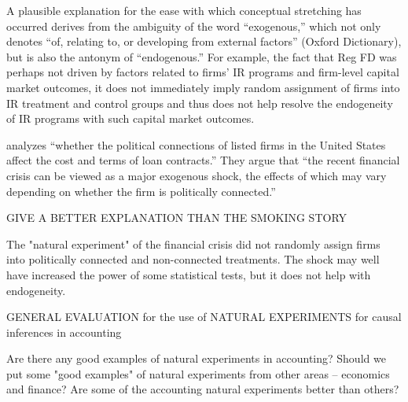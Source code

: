 \documentclass[11pt]{amsart}
\begin{document}
A plausible explanation for the ease with which conceptual stretching has occurred derives from the ambiguity of the word ``exogenous,'' which not only denotes  ``of, relating to, or developing from external factors'' (Oxford Dictionary), but is also the antonym of ``endogenous.''
For example, the fact that Reg FD was perhaps not driven by factors related to firms' IR programs and firm-level capital market outcomes, it does not immediately imply random assignment of firms into IR treatment and control groups and thus does not help resolve the endogeneity of IR programs with such capital market outcomes.

\cite{Houston:2014hv} analyzes ``whether the political connections of listed firms in the United States affect the cost and terms of loan contracts.'' They argue that ``the recent financial crisis can be viewed as a major exogenous shock, the effects of which may vary depending on whether the firm is politically connected.'' 

GIVE A BETTER EXPLANATION THAN THE SMOKING STORY

The "natural experiment" of the financial crisis did not randomly assign firms into politically connected and non-connected treatments.  The shock may well have increased the power of some statistical tests, but it does not help with endogeneity.




GENERAL EVALUATION for the use of NATURAL EXPERIMENTS for causal inferences in accounting 

Are there any good examples of natural experiments in accounting?  Should we put some "good examples" of natural experiments from other areas -- economics and finance?  Are some of the accounting natural experiments better than others?
\end{document}
